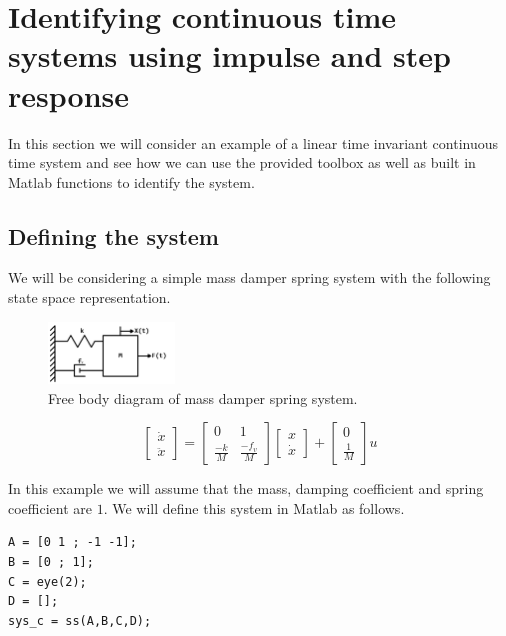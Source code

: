 \section{Identifying continuous time systems using impulse and step response}
In this section we will consider an example of a linear time invariant continuous time system and see how we can use the provided toolbox as well as built in Matlab functions to identify the system.

\subsection{Defining the system}
We will be considering a simple mass damper spring system with the following state space representation.

\begin{figure}[H]
	\centering
	\includegraphics[width=0.3\textwidth]{MSD.png}
	\caption{Free body diagram of mass damper spring system.}
\end{figure}

\begin{equation*}
\begin{bmatrix}
\dot{x} \\ \ddot{x}
\end{bmatrix} = 
\begin{bmatrix}
0 & 1 \\ \frac{-k}{M} & \frac{-f_v}{M}
\end{bmatrix}  
\begin{bmatrix}
x \\ \dot{x}
\end{bmatrix} +
\begin{bmatrix}
0 \\ \frac{1}{M}
\end{bmatrix} 
u
\end{equation*}

In this example we will assume that the mass, damping coefficient and spring coefficient are $1$. We will define this system in Matlab as follows.

\begin{lstlisting}
A = [0 1 ; -1 -1];
B = [0 ; 1];
C = eye(2);
D = [];
sys_c = ss(A,B,C,D);
\end{lstlisting}

